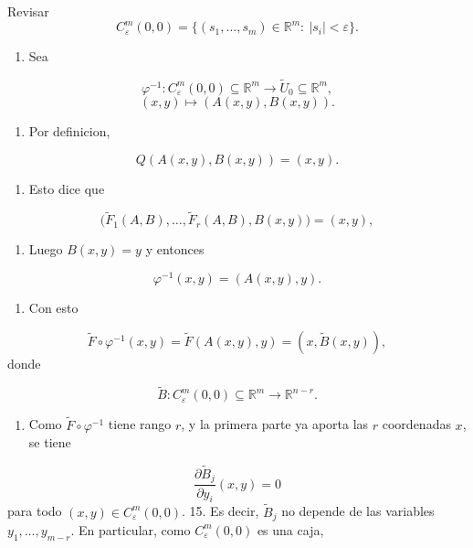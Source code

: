 \begin{bookproof}{Revisar}
\[
C_\varepsilon^m(0,0)=\{(s_1,\ldots,s_m)\in\mathbb R^m:\ |s_i|<\varepsilon\}.
\]
\begin{enumerate}[start=9]
\item Sea
\end{enumerate}
\[
\varphi^{-1}:C_\varepsilon^m(0,0)\subseteq\mathbb R^m\to \widetilde U_0\subseteq\mathbb R^m,
\]
\[
(x,y)\mapsto (A(x,y),B(x,y)).
\]
\begin{enumerate}[start=10]
\item Por definicion,
\end{enumerate}
\[
Q(A(x,y),B(x,y))=(x,y).
\]
\begin{enumerate}[start=11]
\item Esto dice que
\end{enumerate}
\[
\big(\widetilde F_1(A,B),\ldots,\widetilde F_r(A,B),B(x,y)\big)=(x,y),
\]
\begin{enumerate}[start=12]
\item Luego $B(x,y)=y$ y entonces
\end{enumerate}
\[
\varphi^{-1}(x,y)=(A(x,y),y).
\]
\begin{enumerate}[start=13]
\item Con esto
\end{enumerate}
\[
\widetilde F\circ\varphi^{-1}(x,y)=\widetilde F(A(x,y),y)=(x,\widetilde B(x,y)),
\]
donde

\[
\widetilde B:C_\varepsilon^m(0,0)\subseteq\mathbb R^m\to\mathbb R^{n-r}.
\]
\begin{enumerate}[start=14]
\item Como $\widetilde F\circ\varphi^{-1}$ tiene rango $r$, y la primera parte ya aporta las $r$ coordenadas $x$, se tiene
\end{enumerate}
\[
\frac{\partial \widetilde B_j}{\partial y_i}(x,y)=0
\]
para todo $(x,y)\in C_\varepsilon^m(0,0)$. 15. Es decir, $\widetilde B_j$ no depende de las variables $y_1,\ldots,y_{m-r}$. En particular, como $C_\varepsilon^m(0,0)$ es una caja,


\end{bookproof}
